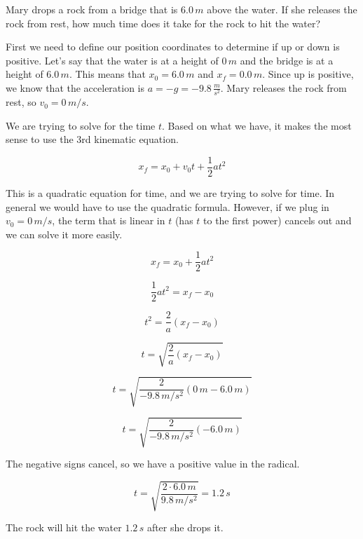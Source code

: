 \documentclass[12pt]{book}
\begin{document}
\begin{exampleblock}

Mary drops a rock from a bridge that is $6.0 \, m$ above the water. If she releases the rock from rest, how much time does it take for the rock to hit the water?

\hspace{10pt}

First we need to define our position coordinates to determine if up or down is positive. Let's say that the water is at a height of $0 \, m$ and the bridge is at a height of $6.0 \, m$. This means that $x_0 = 6.0 \, m$ and $x_f = 0.0 \, m$. Since up is positive, we know that the acceleration is $a = -g = -9.8 \, \frac{m}{s^2}$. Mary releases the rock from rest, so $v_0 = 0 \, m/s$.

We are trying to solve for the time $t$. Based on what we have, it makes the most sense to use the 3rd kinematic equation.

\begin{equation}
x_f = x_0 + v_0 t + \frac{1}{2} a t^2
\end{equation}

This is a quadratic equation for time, and we are trying to solve for time. In general we would have to use the quadratic formula. However, if we plug in $v_0 = 0 \, m/s$, the term that is linear in $t$ (has $t$ to the first power) cancels out and we can solve it more easily.

\begin{equation}
x_f = x_0 + \frac{1}{2} a t^2
\end{equation}

\begin{equation}
\frac{1}{2} a t^2 = x_f - x_0
\end{equation}

\begin{equation}
t^2 = \frac{2}{a} (x_f - x_0)
\end{equation}

\begin{equation}
t = \sqrt{\frac{2}{a} (x_f - x_0)}
\end{equation}

\begin{equation}
t = \sqrt{\frac{2}{-9.8 \, m/s^2} (0 \, m - 6.0 \, m)}
\end{equation}

\begin{equation}
t = \sqrt{\frac{2}{-9.8 \, m/s^2} (-6.0 \, m)}
\end{equation}

The negative signs cancel, so we have a positive value in the radical.

\begin{equation}
t = \sqrt{\frac{2 \cdot 6.0 \, m}{9.8 \, m/s^2}} = 1.2 \, s
\end{equation}

The rock will hit the water $1.2 \, s$ after she drops it.

\end{exampleblock}
\end{document}
